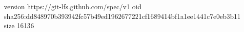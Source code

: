 version https://git-lfs.github.com/spec/v1
oid sha256:dd848970b393942fc57b49ed1962677221cf1689414bf1a1ee1441c7e0eb3b11
size 16136
